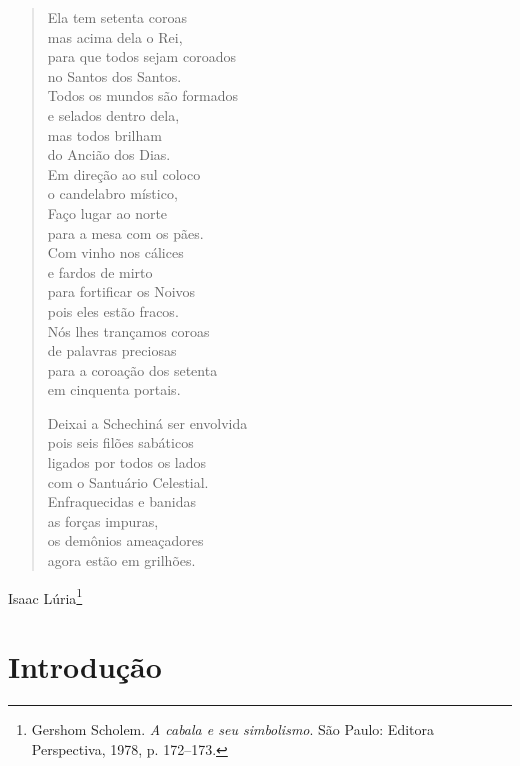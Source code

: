 \begin{verse}
Ela tem setenta coroas\\
mas acima dela o Rei,\\
para que todos sejam coroados\\
no Santos dos Santos.\\[5pt]

Todos os mundos são formados\\
e selados dentro dela,\\
mas todos brilham\\
do Ancião dos Dias.\\[5pt]

Em direção ao sul coloco\\
o candelabro místico,\\
Faço lugar ao norte\\
para a mesa com os pães.\\[5pt]

Com vinho nos cálices\\
e fardos de mirto\\
para fortificar os Noivos\\
pois eles estão fracos.\\[5pt]

Nós lhes trançamos coroas\\
de palavras preciosas\\
para a coroação dos setenta\\
em cinquenta portais.\\[5pt]

\pagebreak

Deixai a Schechiná ser envolvida\\
pois seis filões sabáticos\\
ligados por todos os lados\\
com o Santuário Celestial.\\[5pt]

Enfraquecidas e banidas\\
as forças impuras,\\
os demônios ameaçadores\\
agora estão em grilhões.
\end{verse}

\begin{flushright}
Isaac Lúria\footnote{Gershom Scholem. \emph{A cabala e seu simbolismo}. São Paulo: Editora Perspectiva, 1978, p. 172--173.}
\end{flushright}

\chapter*{Introdução }

